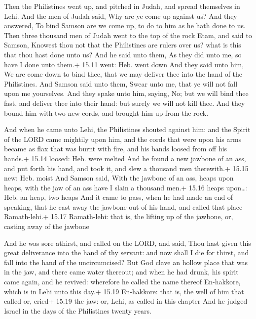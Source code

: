  Then the Philistines went up, and pitched in Judah, and
spread themselves in Lehi.  And the men of Judah said, Why
are ye come up against us? And they answered, To bind Samson are we come
up, to do to him as he hath done to us.  Then three
thousand men of Judah went to the top of the rock Etam, and said to
Samson, Knowest thou not that the Philistines are rulers over us? what
is this that thou hast done unto us? And he said unto them, As they did
unto me, so have I done unto them.+ 15.11 went: Heb. went down
 And they said unto him, We are come down to bind thee,
that we may deliver thee into the hand of the Philistines. And Samson
said unto them, Swear unto me, that ye will not fall upon me yourselves.
 And they spake unto him, saying, No; but we will bind thee
fast, and deliver thee into their hand: but surely we will not kill
thee. And they bound him with two new cords, and brought him up from the
rock.

 And when he came unto Lehi, the Philistines shouted
against him: and the Spirit of the LORD came mightily upon him, and the
cords that were upon his arms became as flax that was burnt with fire,
and his bands loosed from off his hands.+ 15.14 loosed: Heb. were melted
 And he found a new jawbone of an ass, and put forth his
hand, and took it, and slew a thousand men therewith.+ 15.15 new: Heb.
moist  And Samson said, With the jawbone of an ass, heaps
upon heaps, with the jaw of an ass have I slain a thousand men.+ 15.16
heaps upon\ldots: Heb. an heap, two heaps  And it came to
pass, when he had made an end of speaking, that he cast away the jawbone
out of his hand, and called that place Ramath-lehi.+ 15.17 Ramath-lehi:
that is, the lifting up of the jawbone, or, casting away of the jawbone

 And he was sore athirst, and called on the LORD, and
said, Thou hast given this great deliverance into the hand of thy
servant: and now shall I die for thirst, and fall into the hand of the
uncircumcised?  But God clave an hollow place that was in
the jaw, and there came water thereout; and when he had drunk, his
spirit came again, and he revived: wherefore he called the name thereof
En-hakkore, which is in Lehi unto this day.+ 15.19 En-hakkore: that is,
the well of him that called or, cried+ 15.19 the jaw: or, Lehi, as
called in this chapter  And he judged Israel in the days of
the Philistines twenty years.

